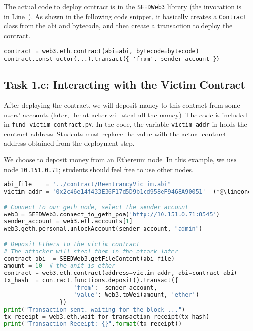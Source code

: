 The actual code to deploy contract is in the \texttt{SEEDWeb3} 
library (the invocation is in Line~\lineone). 
As shown in the following code snippet, 
it basically creates a \texttt{Contract} class from the abi and 
bytecode, and then create a transaction to deploy the contract.

\begin{lstlisting}
contract = web3.eth.contract(abi=abi, bytecode=bytecode)
contract.constructor(...).transact({ 'from': sender_account })
\end{lstlisting}
 


\subsection{Task 1.c: Interacting with the Victim Contract} 

After deploying the contract, we will deposit money to this contract
from some users' accounts (later, the attacker will steal all the
money). The code is included in \texttt{fund\_victim\_contract.py}. 
In the code, the variable \texttt{victim\_addr} in \lineone
holds the contract address. Students must replace the value
with the actual contract address obtained from the 
deployment step. 


We choose to deposit money from an Ethereum node. In this 
example, we use node \texttt{10.151.0.71}; students should feel
free to use other nodes. 

\begin{lstlisting}[language=python,
        caption=Deposit money (\texttt{fund\_victim\_contract.py})]
abi_file    = "../contract/ReentrancyVictim.abi"
victim_addr = '0x2c46e14f433E36F17d5D9b1cd958eF9468A90051'  (*@\lineone@*) 

# Connect to our geth node, select the sender account
web3 = SEEDWeb3.connect_to_geth_poa('http://10.151.0.71:8545')
sender_account = web3.eth.accounts[1]
web3.geth.personal.unlockAccount(sender_account, "admin")

# Deposit Ethers to the victim contract
# The attacker will steal them in the attack later
contract_abi  = SEEDWeb3.getFileContent(abi_file)
amount = 10  # the unit is ether
contract = web3.eth.contract(address=victim_addr, abi=contract_abi)
tx_hash  = contract.functions.deposit().transact({
                    'from':  sender_account,
                    'value': Web3.toWei(amount, 'ether')
                })
print("Transaction sent, waiting for the block ...")
tx_receipt = web3.eth.wait_for_transaction_receipt(tx_hash)
print("Transaction Receipt: {}".format(tx_receipt))
\end{lstlisting}


